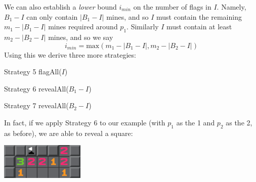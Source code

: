 \documentclass{article}
\theoremstyle{definition}
\theoremstyle{definition}
\theoremstyle{theorem}
\begin{document}
	We can also establish a \textit{lower} bound $i_{min}$ on the number of flags in $I$. Namely, $B_1 - I$ can only contain $|B_1 - I|$ mines, and so $I$ must contain the remaining $m_1 - |B_1 - I|$ mines required around $p_1$. Similarly $I$ must contain at least $m_2 - |B_2 - I|$ mines, and so we say
	$$i_{min} = \textrm{max}(m_1 - |B_1 - I|, m_2 - |B_2 - I|)$$
	Using this we derive three more strategies:
	\begin{algorithmic}
		 \Comment Strategy 5
		\State flagAll($I$)
		\EndIf
	\end{algorithmic}
	\begin{algorithmic}
		 \Comment Strategy 6
		\State revealAll($B_1 - I$)
		\EndIf
	\end{algorithmic}
	\begin{algorithmic}
		 \Comment Strategy 7
		\State revealAll($B_2 - I$)
		\EndIf
	\end{algorithmic}
	In fact, if we apply Strategy 6 to our example (with $p_1$ as the 1 and $p_2$ as the 2, as before), we are able to reveal a square:
	\begin{center}
		\includegraphics[width=0.3\textwidth]{exampleimages/example2c}
	\end{center}
	
\end{document}
